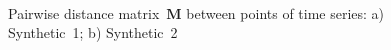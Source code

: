 \documentclass[12pt, twoside]{article}
\numberwithin{equation}{section}
\begin{document}
\begin{figure}[h!t]\center
{}
\\
\caption{Pairwise distance matrix~$\textbf{M}$ between points of time series: a) Synthetic~1; b) Synthetic~2}
\label{fig_synthetic_distance}
\end{figure}
\end{document}
